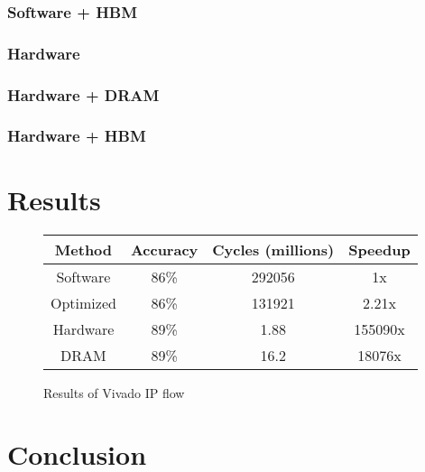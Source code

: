 \documentclass[conference,letter]{IEEEtran}[2015/08/26]
\begin{document}
\subsubsection{Software + HBM}

\subsubsection{Hardware}

\subsubsection{Hardware + DRAM}

\subsubsection{Hardware + HBM}

\section{Results}
\label{sec:results}

\begin{figure}[h]
  \centering
  \begin{tabular}{c|ccc}
    \toprule
    Method    & Accuracy & Cycles (millions) & Speedup \\
    \midrule
    Software  & 86\%     & 292056            & 1x      \\
    Optimized & 86\%     & 131921            & 2.21x   \\
    Hardware  & 89\%     & 1.88              & 155090x \\
    DRAM      & 89\%     & 16.2              & 18076x  \\
    \bottomrule
  \end{tabular}
  \caption{Results of Vivado IP flow}
  \label{tab:ex:cref}
\end{figure}

\section{Conclusion}
\label{sec:conclusion}

\end{document}
